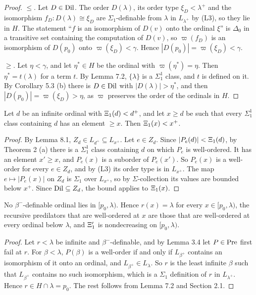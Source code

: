\documentclass[11pt]{article}
\begin{document}
\begin{proof} $\le$. Let $D \in \mathrm{Dil}$. The order $D(\lambda)$, its order type $\xi_D < \lambda^+$ and the isomorphism
$f_D : D(\lambda) \cong \xi_D$ are $\Sigma_1$-definable from $\lambda$ in $L_{\lambda^+}$ by (L3), so they lie in $H$. The statement
``$f$ is an isomorphism of $D(v)$ onto the ordinal $\xi$'' is $\Delta_0$ in a transitive set containing the
computation of $D(v)$, so $\varpi(f_D)$ is an isomorphism of $D(p_0)$ onto $\varpi(\xi_D) < \gamma$. Hence
$|D(p_0)| = \varpi(\xi_D) < \gamma$.

$\ge$. Let $\eta < \gamma$, and let $\eta^* \in H$ be the ordinal with $\varpi(\eta^*) = \eta$. Then
$\eta^* = t(\lambda)$ for a term $t$. By Lemma 7.2, $\{\lambda\}$ is a $\Sigma^1_1$ class, and $t$ is defined on it. By
Corollary 5.3 (b) there is $D \in \mathrm{Dil}$ with $|D(\lambda)| > \eta^*$, and then $|D(p_0)| = \varpi(\xi_D) > \eta$, as $\varpi$
preserves the order of the ordinals in $H$.
\end{proof}

\begin{statement} Let $d$ be an infinite ordinal with $\Xi_1(d) < d^+$, and let $x \ge d$ be such that
every $\Sigma^1_1$ class containing $d$ has an element $\ge x$. Then $\Xi_1(x) < x^+$.
\end{statement}

\begin{proof} By Lemma 8.1, $Z_d \in L_{d^+} \subseteq L_{x^+}$. Let $e \in Z_d$. Since $|P_e(d)| < \Xi_1(d)$, by
Theorem 2 (a) there is a $\Sigma^1_1$ class containing $d$ on which $P_e$ is well-ordered.
It has an element $x' \ge x$, and $P_e(x)$ is a suborder of $P_e(x')$. So $P_e(x)$ is a well-order for every
$e \in Z_d$, and by (L3) its order type is in $L_{x^+}$. The map $e \mapsto |P_e(x)|$ on $Z_d$ is $\Sigma_1$ over
$L_{x^+}$, so by $\Sigma$-collection its values are bounded below $x^+$. Since $\mathrm{Dil} \subseteq Z_d$, the bound
applies to $\Xi_1(x)$.
\end{proof}

\begin{statement} No $\beta^-$-definable ordinal lies in $[p_0, \lambda)$. Hence $r(x) = \lambda$ for every
$x \in [p_0, \lambda)$, the recursive predilators that are well-ordered at $x$ are those that are well-ordered at every
ordinal below $\lambda$, and $\Xi'_1$ is nondecreasing on $[p_0, \lambda)$.
\end{statement}

\begin{proof} Let $r < \lambda$ be infinite and $\beta^-$-definable, and by Lemma 3.4 let $P \in \mathrm{Pre}$ first fail at $r$.
For $\beta < \lambda$, $P(\beta)$ is a well-order if and only if $L_{\beta^+}$ contains an isomorphism of it onto an
ordinal, and $L_{\beta^+} \in L_\lambda$. So $r$ is the least infinite $\beta$ such that $L_{\beta^+}$ contains no such
isomorphism, which is a $\Sigma_1$ definition of $r$ in $L_{\lambda^+}$. Hence $r \in H \cap \lambda = p_0$. The rest follows
from Lemma 7.2 and Section 2.1.
\end{proof}
\end{document}
